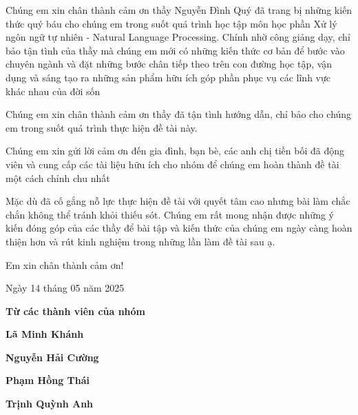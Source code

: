 \documentclass[main.tex]{subfiles}
\begin{document}
Chúng em xin chân thành cảm ơn thầy Nguyễn Đình Quý đã trang bị những kiến thức quý báu cho chúng em trong suốt quá trình học tập môn học phần Xử lý ngôn ngữ tự nhiên - Natural Language Processing. Chính nhờ công giảng dạy, chỉ bảo tận tình của thầy mà chúng em mới có những kiến thức cơ bản để bước vào chuyên ngành và đặt những bước chân tiếp theo trên con đường học tập, vận dụng và sáng tạo ra những sản phẩm hữu ích góp phần phục vụ các lĩnh vực khác nhau của đời sốn

Chúng em xin chân thành cảm ơn thầy đã tận tình hướng dẫn, chỉ bảo cho chúng em trong suốt quá trình thực hiện đề tài này.

Chúng em xin gửi lời cảm ơn đến gia đình, bạn bè, các anh chị tiền bối đã động viên và cung cấp các tài liệu hữu ích cho nhóm để chúng em hoàn thành đề tài một cách chỉnh chu nhất

Mặc dù đã cố gắng nỗ lực thực hiện đề tài với quyết tâm cao nhưng bài làm chắc chắn không thể tránh khỏi thiếu sót. Chúng em rất mong nhận được những ý kiến đóng góp của các thầy để bài tập và kiến thức của chúng em ngày càng hoàn thiện hơn và rút kinh nghiệm trong những lần làm đề tài sau ạ.

\vspace{6pt}
\hspace{12cm}Em xin chân thành cảm ơn!

\hspace{12cm}Ngày 14 tháng 05 năm 2025

\vspace{2cm}

\hspace{12cm}\textbf{Từ các thành viên của nhóm}

\hspace{13cm}\textbf{Lã Minh Khánh}

\hspace{13cm}\textbf{Nguyễn Hải Cường}

\hspace{13cm}\textbf{Phạm Hồng Thái}

\hspace{13cm}\textbf{Trịnh Quỳnh Anh}
\end{document}
